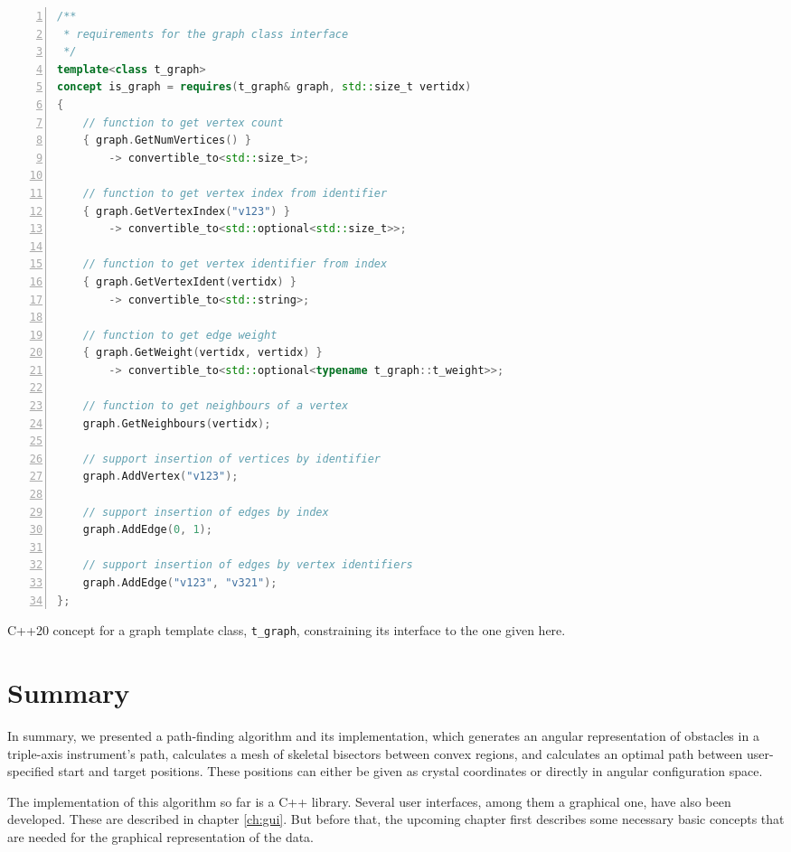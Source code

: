 \begin{listing}[htb]
	\begin{lstlisting}[language = C++,
			basicstyle = {\scriptsize},
			breaklines = true, tabsize = 4,
			numbers = left, numberstyle={\scriptsize}]
/**
 * requirements for the graph class interface
 */
template<class t_graph>
concept is_graph = requires(t_graph& graph, std::size_t vertidx)
{
	// function to get vertex count
	{ graph.GetNumVertices() }
		-> convertible_to<std::size_t>;

	// function to get vertex index from identifier
	{ graph.GetVertexIndex("v123") }
		-> convertible_to<std::optional<std::size_t>>;

	// function to get vertex identifier from index
	{ graph.GetVertexIdent(vertidx) }
		-> convertible_to<std::string>;

	// function to get edge weight
	{ graph.GetWeight(vertidx, vertidx) }
		-> convertible_to<std::optional<typename t_graph::t_weight>>;

	// function to get neighbours of a vertex
	graph.GetNeighbours(vertidx);

	// support insertion of vertices by identifier
	graph.AddVertex("v123");

	// support insertion of edges by index
	graph.AddEdge(0, 1);

	// support insertion of edges by vertex identifiers
	graph.AddEdge("v123", "v321");
};
	\end{lstlisting}
	\caption[C++ graph template concept.]{
	C++20 concept for a graph template class, \lstinline[language=C++]|t_graph|,
	constraining its interface to the one given here.
	\label{lst:graph_concept}}
\end{listing}



\section{Summary}
In summary, we presented a path-finding algorithm and its implementation, which generates an angular 
representation of obstacles in a triple-axis instrument's path, calculates a mesh of skeletal bisectors between 
convex regions, and calculates an optimal path between user-specified start and target positions. These positions
can either be given as crystal coordinates or directly in angular configuration space.

The implementation of this algorithm so far is a C++ library. Several user interfaces, among them a 
graphical one, have also been developed. These are described in chapter \ref{ch:gui}.
But before that, the upcoming chapter first describes some necessary basic concepts that are needed for the 
graphical representation of the data.

